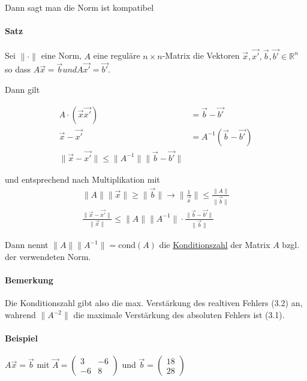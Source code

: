 \documentclass[a4paper,ngerman]{scrbook}
\newcommand{\R}{\ensuremath{\mathbb{R}}}%
\begin{document}
Dann sagt man die Norm ist kompatibel

\paragraph{Satz}

Sei $\|\cdot\|$ eine Norm, $A$ eine reguläre $n\times n$-Matrix die Vektoren $\vec{x}, \vec{x'}, \vec{b}, \vec{b'} \in \R^n$ so dass $A\vec{x} = \vec{b} und A\vec{x'} = \vec{b'}$.

Dann gilt

\begin{align*}
  A\cdot (\vec{x}\vec{x'}) &= \vec{b} - \vec{b'}\\
  \vec{x} - \vec{x'} &= A^{-1}(\vec{b} - \vec{b'})\\
  \|\vec{x}-\vec{x'}\| \leq \|A^{-1}\| \|\vec{b} - \vec{b'}\|
\end{align*}

und entsprechend nach Multiplikation mit
\begin{align}
  \|A\|\|\vec{x}\| \geq \|\vec{b}\| \to   \|\frac{1}{\vec{x}}\| \leq     \frac{\|A\|}{\|\vec{b}\|}\\
  \frac{\|\vec{x} - \vec{x'}\|}{\|\vec{x}\|} \leq \|A\| \|A^{-1}\| \cdot \frac{\|\vec{b}-\vec{b'}\|}{\|\vec{b}\|}
\end{align}

Dann nennt $\|A\| \|A^{-1}\| = \text{cond}(A)$ die \underline{Konditionszahl} der Matrix $A$ bzgl\@. der verwendeten Norm.

\paragraph{Bemerkung}

Die Konditionszahl gibt also die max\@. Verstärkung des realtiven Fehlers (3.2) an, wahrend $\|A^{-2}\|$ die maximale Verstärkung des absoluten Fehlers ist (3.1).

\paragraph{Beispiel}

$A\vec{x} = \vec{b}$ mit $\vec{A} =
\begin{pmatrix}
  3 & -6 \\ -6 & 8
\end{pmatrix}$ und $ \vec{b} =
\begin{pmatrix}
  18\\ 28
\end{pmatrix}
$
\end{document}
